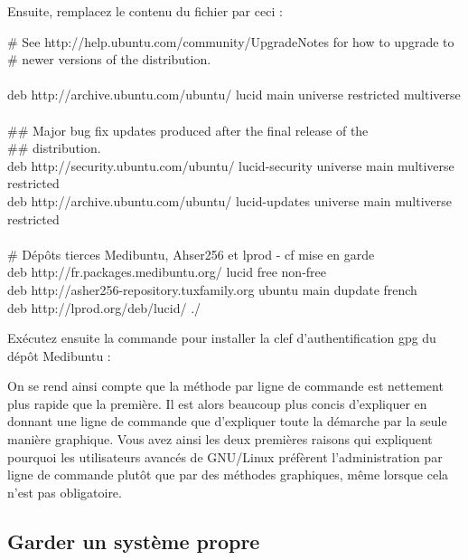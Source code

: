 {Ensuite, remplacez le contenu du fichier par ceci :\\
	\begin{breakbox}%
		\begin{otherlanguage}{english}%
\# See http://help.ubuntu.com/community/UpgradeNotes for how to upgrade to\\
\# newer versions of the distribution.\\
\\
deb http://archive.ubuntu.com/ubuntu/ lucid main universe restricted multiverse\\
\\
\#\# Major bug fix updates produced after the final release of the\\
\#\# distribution.\\
deb http://security.ubuntu.com/ubuntu/ lucid-security universe main multiverse restricted\\
deb http://archive.ubuntu.com/ubuntu/ lucid-updates universe main multiverse restricted\\
\\
\# Dépôts tierces Medibuntu, Ahser256 et lprod - cf mise en garde\\
deb http://fr.packages.medibuntu.org/ lucid free non-free\\
deb http://asher256-repository.tuxfamily.org ubuntu main dupdate french\\
deb http://lprod.org/deb/lucid/ ./
		\end{otherlanguage}%
	\end{breakbox}%
\par
Exécutez ensuite la commande pour installer la clef d'authentification gpg du dépôt Medibuntu :\\\par
\begin{nota}
On se rend ainsi compte que la méthode par ligne de commande est nettement plus rapide que la première. Il est alors beaucoup plus concis d'expliquer en donnant une ligne de commande que d'expliquer toute la démarche par la seule manière graphique. Vous avez ainsi les deux premières raisons qui expliquent pourquoi les utilisateurs avancés de GNU/Linux préfèrent l'administration par ligne de commande plutôt que par des méthodes graphiques, même lorsque cela n'est pas obligatoire.
\end{nota}
\subsection{Garder un système propre}
\label{RefNettoyerSysteme}
}
